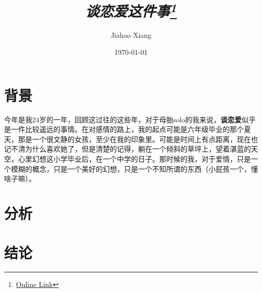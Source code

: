 \documentclass{article}
\title{\textit{谈恋爱这件事\footnote{\href{https://github.com/jiahaoxiang2000/TempWrite/blob/master/think/love.tex}{Online Link}}}}
\author{Jiahao Xiang}
\date{\today}
\begin{document}
\maketitle

\section{背景}
今年是我24岁的一年，回顾这过往的这些年，对于母胎solo的我来说，\textbf{谈恋爱}似乎是一件比较遥远的事情。在对感情的路上，我的起点可能是六年级毕业的那个夏天，那是一个很文静的女孩，至少在我的印象里。可能是时间上有点距离，现在也记不清为什么喜欢她了，但是清楚的记得，躺在一个倾斜的草坪上，望着湛蓝的天空，心里幻想这小学毕业后，在一个中学的日子。那时候的我，对于爱情，只是一个模糊的概念，只是一个美好的幻想，只是一个不知所谓的东西（小屁孩一个，懂啥子嘛）。



\section{分析}


\section{结论}
\end{document}
